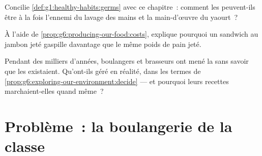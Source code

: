 \begin{exercise}[$\star\star$]\label{exo:g6:producing-our-food:10}
Concilie \cref{def:g1:healthy-habits:germs} avec ce chapitre~:
comment les  peuvent-ils être à la fois l'ennemi du lavage
des mains et la main-d'œuvre du yaourt~?
\end{exercise}

\begin{exercise}[$\star\star$]\label{exo:g6:producing-our-food:11}
À l'aide de \cref{prop:g6:producing-our-food:costs}, explique
pourquoi un sandwich au jambon jeté gaspille davantage que le même
poids de pain jeté.
\end{exercise}

\begin{exercise}[$\star\star\star$]\label{exo:g6:producing-our-food:12}
Pendant des milliers d'années, boulangers et brasseurs ont mené la
 sans savoir que les  existaient. Qu'ont-ils
géré en réalité, dans les termes de
\cref{prop:g6:exploring-our-environment:decide} --- et pourquoi
leurs recettes marchaient-elles quand même~?
\end{exercise}

\section{Problème~: la boulangerie de la classe}

